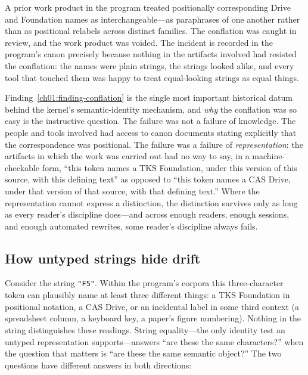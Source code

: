 \begin{finding}\label{ch01:finding-conflation}
A prior work product in the program treated positionally corresponding
Drive and Foundation names as interchangeable---as paraphrases of one
another rather than as positional relabels across distinct families. The
conflation was caught in review, and the work product was voided. The
incident is recorded in the program's canon precisely because nothing in
the artifacts involved had resisted the conflation: the names were plain
strings, the strings looked alike, and every tool that touched them was
happy to treat equal-looking strings as equal things.
\end{finding}

Finding~\ref{ch01:finding-conflation} is the single most important
historical datum behind the kernel's semantic-identity mechanism, and \emph{why}
the conflation was so easy is the instructive question. The failure was
not a failure of knowledge. The people and tools involved had access to
canon documents stating explicitly that the correspondence was positional.
The failure was a failure of \emph{representation}: the artifacts in which
the work was carried out had no way to say, in a machine-checkable form,
``this token names a TKS Foundation, under this version of this source,
with this defining text'' as opposed to ``this token names a CAS Drive,
under that version of that source, with that defining text.'' Where the
representation cannot express a distinction, the distinction survives only
as long as every reader's discipline does---and across enough readers,
enough sessions, and enough automated rewrites, some reader's discipline
always fails.

\subsection{How untyped strings hide drift}\label{ch01:strings}

Consider the string \texttt{"F5"}. Within the program's corpora this
three-character token can plausibly name at least three different things: a
TKS Foundation in positional notation, a CAS Drive, or an incidental label
in some third context (a spreadsheet column, a keyboard key, a paper's
figure numbering). Nothing in the string distinguishes these readings.
String equality---the only identity test an untyped representation
supports---answers ``are these the same characters?'' when the question
that matters is ``are these the same semantic object?'' The two questions
have different answers in both directions:

